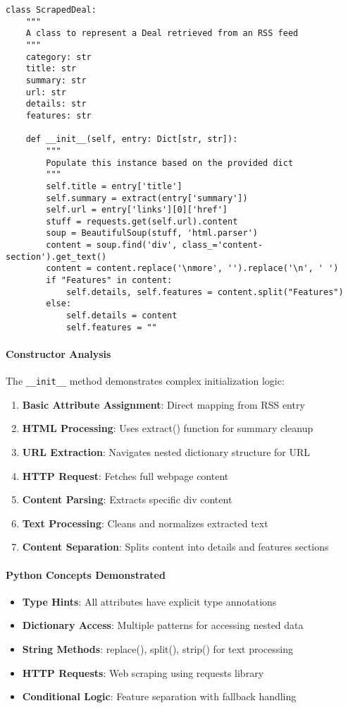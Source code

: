 \begin{lstlisting}[caption=ScrapedDeal Class Implementation]
class ScrapedDeal:
    """
    A class to represent a Deal retrieved from an RSS feed
    """
    category: str
    title: str
    summary: str
    url: str
    details: str
    features: str

    def __init__(self, entry: Dict[str, str]):
        """
        Populate this instance based on the provided dict
        """
        self.title = entry['title']
        self.summary = extract(entry['summary'])
        self.url = entry['links'][0]['href']
        stuff = requests.get(self.url).content
        soup = BeautifulSoup(stuff, 'html.parser')
        content = soup.find('div', class_='content-section').get_text()
        content = content.replace('\nmore', '').replace('\n', ' ')
        if "Features" in content:
            self.details, self.features = content.split("Features")
        else:
            self.details = content
            self.features = ""
\end{lstlisting}

\paragraph{Constructor Analysis}
The \texttt{\_\_init\_\_} method demonstrates complex initialization logic:

\begin{enumerate}
\item \textbf{Basic Attribute Assignment}: Direct mapping from RSS entry
\item \textbf{HTML Processing}: Uses extract() function for summary cleanup
\item \textbf{URL Extraction}: Navigates nested dictionary structure for URL
\item \textbf{HTTP Request}: Fetches full webpage content
\item \textbf{Content Parsing}: Extracts specific div content
\item \textbf{Text Processing}: Cleans and normalizes extracted text
\item \textbf{Content Separation}: Splits content into details and features sections
\end{enumerate}

\paragraph{Python Concepts Demonstrated}
\begin{itemize}
\item \textbf{Type Hints}: All attributes have explicit type annotations
\item \textbf{Dictionary Access}: Multiple patterns for accessing nested data
\item \textbf{String Methods}: replace(), split(), strip() for text processing
\item \textbf{HTTP Requests}: Web scraping using requests library
\item \textbf{Conditional Logic}: Feature separation with fallback handling
\end{itemize}

